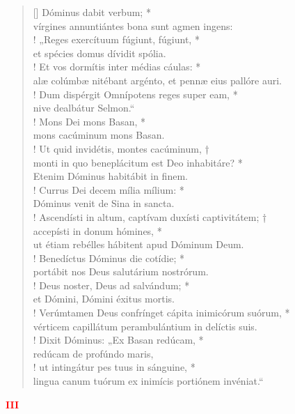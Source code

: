 \begin{verse}[\versewidth]
Dóminus dabit verbum; *\\
vírgines annuntiántes bona sunt agmen ingens:\\!
\vin „Reges exercítuum fúgiunt, fúgiunt, *\\
\vin et spécies domus dívidit spólia.\\!
Et vos dormítis inter médias cáulas: *\\
alæ colúmbæ nitébant argénto, et pennæ eius pallóre auri.\\!
\vin Dum dispérgit Omnípotens reges super eam, *\\
\vin nive dealbátur Selmon.“\\!
Mons Dei mons Basan, *\\
mons cacúminum mons Basan.\\!
\vin Ut quid invidétis, montes cacúminum, †\\
\vin monti in quo beneplácitum est Deo inhabitáre? *\\
\vin Etenim Dóminus habitábit in finem.\\!
Currus Dei decem mília mílium: *\\
Dóminus venit de Sina in sancta.\\!
\vin Ascendísti in altum, captívam duxísti captivitátem; †\\
\vin accepísti in donum hómines, *\\
\vin ut étiam rebélles hábitent apud Dóminum Deum.\\!
Benedíctus Dóminus die cotídie; *\\
portábit nos Deus salutárium nostrórum.\\!
\vin Deus noster, Deus ad salvándum; *\\
\vin et Dómini, Dómini éxitus mortis.\\!
Verúmtamen Deus confrínget cápita inimicórum suórum, *\\
vérticem capillátum perambulántium in delíctis suis.\\!
\vin Dixit Dóminus: „Ex Basan redúcam, *\\
\vin redúcam de profúndo maris,\\!
ut intingátur pes tuus in sánguine, *\\
lingua canum tuórum ex inimícis portiónem invéniat.“\\
\end{verse}
\begin{center}
\textcolor{red}{\bf III}
\end{center}
